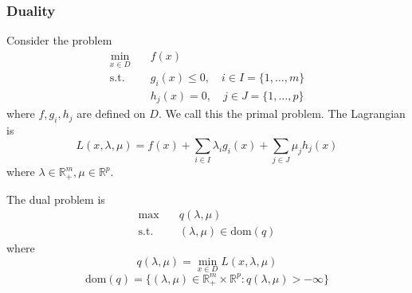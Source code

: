 \subsubsection{Duality}
Consider the problem
\begin{align*}
    \min_{x \in D} \quad &f(x) \\
    \mathrm{s.t.} \quad &g_i(x) \leq 0, \quad i \in I = \{1,\ldots,m\} \\
    &h_j(x) = 0, \quad j \in J = \{1,\ldots,p\}
\end{align*}
where $f, g_i, h_j$ are defined on $D$. We call this the primal problem. The Lagrangian is
$$L(x, \lambda, \mu) = f(x) + \sum_{i \in I} \lambda_i g_i(x) + \sum_{j \in J} \mu_j h_j(x)$$
where $\lambda \in \mathbb R^m_+, \mu \in \mathbb R^p$.

\bigskip
The dual problem is
\begin{align*}
    \max \quad &q(\lambda, \mu) \\
    \text{s.t.} \quad &(\lambda, \mu) \in \mathrm{dom}(q)
\end{align*}
where $$q(\lambda, \mu) = \min_{x \in D} L(x, \lambda, \mu)$$ $$\mathrm{dom}(q) = \{(\lambda, \mu) \in \mathbb R^m_+ \times \mathbb R^p: q(\lambda, \mu) > -\infty\}$$

